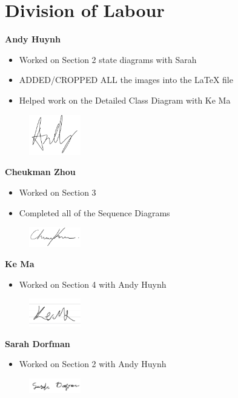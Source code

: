 \appendix
\section{Division of Labour}
\label{sec:division_of_labour}

\textbf{Andy Huynh}
\begin{itemize}
    \item Worked on Section 2 state diagrams with Sarah
    \item ADDED/CROPPED ALL the images into the LaTeX file
    \item Helped work on the Detailed Class Diagram with Ke Ma
\end{itemize}
\begin{figure}[H]
	\centering
	\includegraphics[width=0.2\textwidth]{Signatures/a.png}  
\end{figure}

\textbf{Cheukman Zhou}
\begin{itemize}
    \item Worked on Section 3
    \item Completed all of the Sequence Diagrams
\end{itemize}
\begin{figure}[H]
	\centering
	\includegraphics[width=0.2\textwidth]{Signatures/c.png}
\end{figure}

\textbf{Ke Ma}
\begin{itemize}
    \item Worked on Section 4 with Andy Huynh
\end{itemize}
\begin{figure}[H]
	\centering
	\includegraphics[width=0.2\textwidth]{Signatures/k.png}
\end{figure}

\textbf{Sarah Dorfman}
\begin{itemize}
    \item Worked on Section 2 with Andy Huynh
\end{itemize}
\begin{figure}[H]
	\centering
	\includegraphics[width=0.2\textwidth]{Signatures/s.png}
\end{figure}

